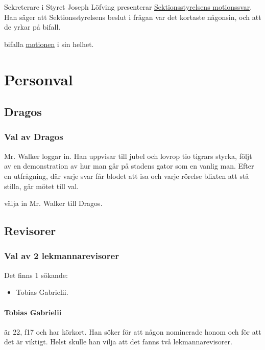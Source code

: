 \documentclass[hidelinks]{sektionsmote}
\begin{document}
Sekreterare i Styret Joseph Löfving presenterar \hyperlink{bilagor/motion/csvar.pdf.1}{Sektionsstyrelsens motionssvar}.
Han säger att Sektionsstyrelsens beslut i frågan var det kortaste någonsin, och att de yrkar på bifall.

\begin{beslut}
  \item bifalla \hyperlink{bilagor/motion/c.pdf.1}{motionen} i sin helhet.
\end{beslut}


\section{Personval}

\subsection{Dragos}

\subsubsection{Val av Dragos}
Mr. Walker loggar in.
Han uppvisar till jubel och lovrop tio tigrars styrka, följt av en demonstration av hur man går på stadens gator som en vanlig man.
Efter en utfrågning, där varje svar får blodet att isa och varje rörelse blixten att stå stilla, går mötet till val.

\begin{beslut}
  \item välja in Mr. Walker till Dragos.
\end{beslut}

\subsection{Revisorer}

\subsubsection{Val av 2 lekmannarevisorer}
Det finns 1 sökande:
\begin{itemize}
    \item Tobias Gabrielii.
\end{itemize}

\paragraph{Tobias Gabrielii} är 22, f17 och har körkort.
Han söker för att någon nominerade honom och för att det är viktigt.
Helst skulle han vilja att det fanns två lekmannarevisorer.
\end{document}
